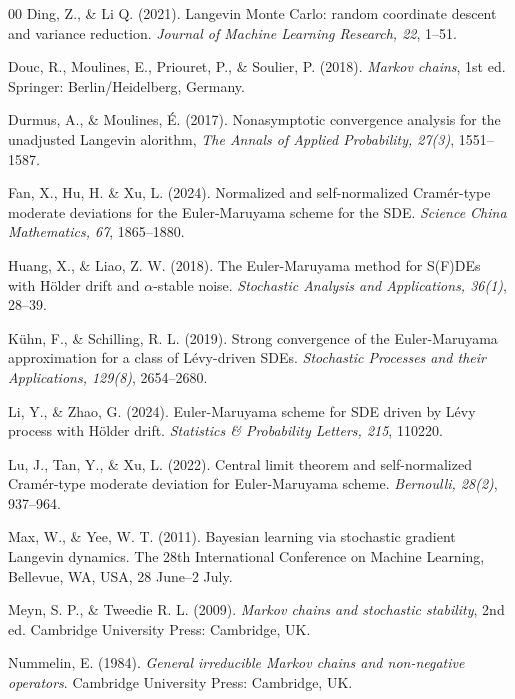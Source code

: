 \documentclass[11pt]{elsarticle}
\begin{document}
\begin{thebibliography}{00}
	 Ding, Z., \& Li Q. (2021). Langevin Monte Carlo: random coordinate descent and variance reduction. \textit{Journal of Machine Learning Research, 22}, 1--51. 
	
	 Douc, R., Moulines, E., Priouret, P., \& Soulier, P. (2018). \textit{Markov chains}, 1st ed. Springer: Berlin/Heidelberg, Germany.
	
	 Durmus, A., \& Moulines, \'{E}. (2017). Nonasymptotic convergence analysis for the unadjusted Langevin alorithm, \textit{The Annals of Applied Probability, 27(3)}, 1551--1587. 
	
	 Fan, X., Hu, H. \& Xu, L. (2024). Normalized and self-normalized Cram\'{e}r-type moderate deviations for the Euler-Maruyama scheme for the SDE. \textit{Science China Mathematics, 67}, 1865--1880. 
	
	 Huang, X., \& Liao, Z. W. (2018). The Euler-Maruyama method for S(F)DEs with H\"{o}lder drift and $\alpha$-stable noise. \textit{Stochastic Analysis and Applications, 36(1)}, 28--39. 
	
	 K\"{u}hn, F., \& Schilling, R. L. (2019). Strong convergence of the Euler-Maruyama approximation for a class of L\'{e}vy-driven SDEs. \textit{Stochastic Processes and their Applications, 129(8)}, 2654--2680. 
	
	 Li, Y., \& Zhao, G. (2024). Euler-Maruyama scheme for SDE driven by L\'{e}vy process with H\"{o}lder drift. \textit{Statistics \& Probability Letters, 215}, 110220. 
	
	 Lu, J., Tan, Y., \& Xu, L. (2022). Central limit theorem and self-normalized Cram\'{e}r-type moderate deviation for Euler-Maruyama scheme. \textit{Bernoulli, 28(2)}, 937--964. 
	
	 Max, W., \& Yee, W. T. (2011). Bayesian learning via stochastic gradient Langevin dynamics. The 28th International Conference on Machine Learning, Bellevue, WA, USA, 28 June--2 July.
	
	 Meyn, S. P., \& Tweedie R. L. (2009). \textit{Markov chains and stochastic stability}, 2nd ed. Cambridge University Press: Cambridge, UK.
	
	 Nummelin, E. (1984). \textit{General irreducible Markov chains and non-negative operators}. Cambridge University Press: Cambridge, UK.
	

\end{thebibliography}
\end{document}
